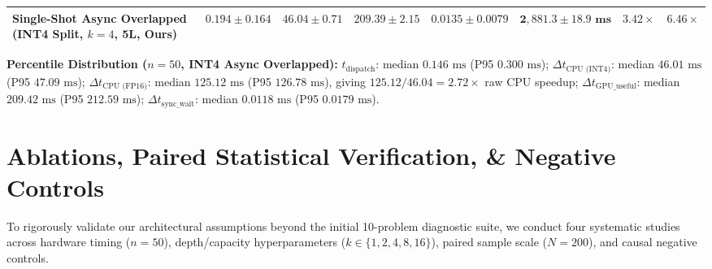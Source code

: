 \documentclass[10pt,twocolumn]{article}
\begin{document}
\begin{table}[t]
{\begin{tabular}{lccccccc}
\textbf{Single-Shot Async Overlapped (INT4 Split, $k=4$, 5L, Ours)} & $\mathbf{0.194 \pm 0.164}$ & $\mathbf{46.04 \pm 0.71}$ & $\mathbf{209.39 \pm 2.15}$ & $\mathbf{0.0135 \pm 0.0079}$ & $\mathbf{2,881.3 \pm 18.9\text{ ms}}$ & $\mathbf{3.42\times}$ & $\mathbf{6.46\times}$ \\
\bottomrule
\end{tabular}%
}
\vspace{2pt}\par
{\footnotesize \textbf{Percentile Distribution ($n=50$, INT4 Async Overlapped):} $t_{\text{dispatch}}$: median $0.146\text{ ms}$ (P95 $0.300\text{ ms}$); $\Delta t_{\text{CPU (INT4)}}$: median $46.01\text{ ms}$ (P95 $47.09\text{ ms}$); $\Delta t_{\text{CPU (FP16)}}$: median $125.12\text{ ms}$ (P95 $126.78\text{ ms}$), giving $\mathbf{125.12 / 46.04 = 2.72\times}$ raw CPU speedup; $\Delta t_{\text{GPU\_useful}}$: median $209.42\text{ ms}$ (P95 $212.59\text{ ms}$); $\Delta t_{\text{sync\_wait}}$: median $0.0118\text{ ms}$ (P95 $0.0179\text{ ms}$).}
\end{table}

\section{Ablations, Paired Statistical Verification, \& Negative Controls}
\label{sec:ablations}
To rigorously validate our architectural assumptions beyond the initial 10-problem diagnostic suite, we conduct four systematic studies across hardware timing ($n=50$), depth/capacity hyperparameters ($k \in \{1,2,4,8,16\}$), paired sample scale ($N=200$), and causal negative controls.
\end{document}

